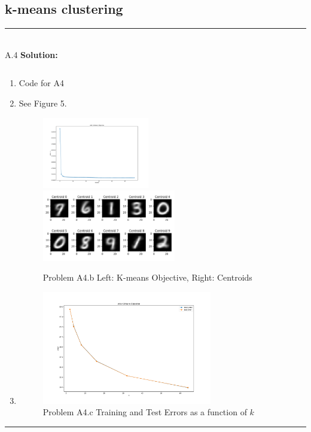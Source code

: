 \documentclass{article}
\newcommand{\1}{\mathbf{1}}
\begin{document}
\subsection*{k-means clustering}
\noindent\rule{\textwidth}{1pt}
\\
A.4 {\bf Solution:}\\
\begin{enumerate}
    \item \inputminted{python}{code/A4.py}
          \caption{Code for A4}
    \item See Figure 5.
        \begin{figure}[h!]
            \centering
            \includegraphics[width=0.44\textwidth]{hw3/code/figures/A4b_obj.pdf}
            \includegraphics[width=0.55\textwidth]{hw3/code/figures/A4b_centroids.pdf}
            \caption{Problem A4.b Left: K-means Objective, Right: Centroids}
        \end{figure}
    \item
        \begin{figure}[h!]
            \centering
            \includegraphics[width=0.7\textwidth]{hw3/code/figures/A4c_.pdf}
            \caption{Problem A4.c Training and Test Errors as a function of $k$}
        \end{figure}
\end{enumerate}   
\noindent\rule{\textwidth}{1pt}
\end{document}
